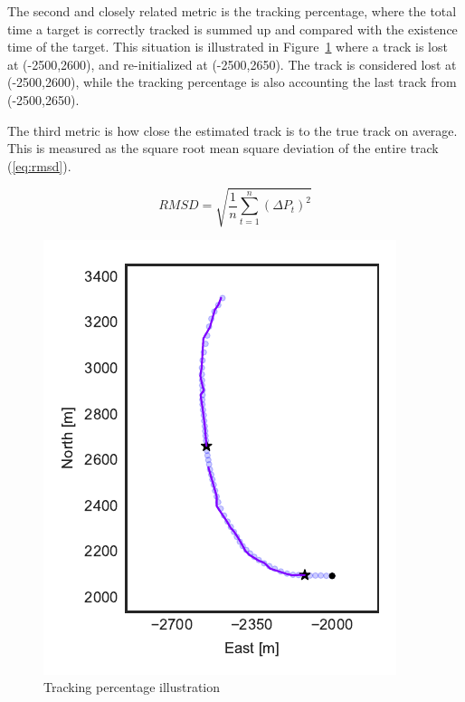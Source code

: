 The second and closely related metric is the tracking percentage, where the total time a target is correctly tracked is summed up and compared with the existence time of the target. This situation is illustrated in Figure~\ref{fig:track_percentage} where a track is lost at (-2500,2600), and re-initialized at (-2500,2650). The track is considered lost at (-2500,2600), while the tracking percentage is also accounting the last track from (-2500,2650). 

The third metric is how close the estimated track is to the true track on average. This is measured as the square root mean square deviation of the entire track (\ref{eq:rmsd}).

\begin{equation}\label{eq:rmsd}
RMSD = \sqrt{\frac{1}{n}\sum_{t=1}^{n}{(\Delta P_t)}^2}
\end{equation}
\begin{figure}
\centering
\includegraphics{Figures/plots/TrackingPercentageExample.pdf}
\caption{Tracking percentage illustration}\label{fig:track_percentage}
\end{figure}

